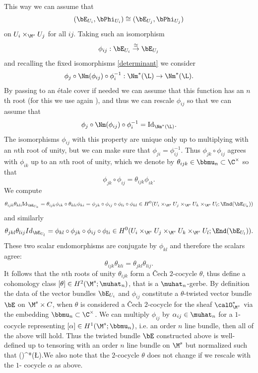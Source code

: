 This way we can assume that $$(\bE_{U_i},\bPhi_{U_i})\cong (\bE_{U_j},\bPhi_{U_j})$$ on $U_i\times_{\M^s} U_j$ for all ${ij}$. Taking such an isomorphism $$\phi_{ij}: \bE_{U_i} \stackrel{\cong}{\to} \bE_{U_j}$$ and recalling the fixed isomorphisms \eqref{determinant} we consider $$\phi_j\circ \Nm(\phi_{ij}) \circ \phi_i^{-1}:\Nm^*(\L)\to \Nm^*(\L).$$ By passing to an \'etale cover if needed we can assume that this function has an $n$th root (for this we use again \cite[Theorem 4.1]{artin}), and thus we can rescale $\phi_{ij}$ so that we can assume that $$\phi_j\circ \Nm(\phi_{ij}) \circ \phi_i^{-1}={\mathrm{Id}}_{\Nm^*(\L)}.$$ The isomorphisms $\phi_{ij}$ with this property are unique only up to multiplying with an $n$th root of unity, but we can make sure that $\phi_{ji}=\phi_{ij}^{-1}$.
Thus $\phi_{jk}\circ\phi_{ij}$ agrees with $\phi_{ik}$ up to an $n$th root of unity, which we denote by $\theta_{ijk}\in \bbmu_n\subset \C^\times$ so that $$\phi_{jk}\circ\phi_{ij}=\theta_{ijk}\phi_{ik}.$$
We compute $$\theta_{ijk} \theta_{kli}{\mathrm{Id}}_{\bE_{U_k}}= \theta_{ijk}\phi_{ik}\circ \theta_{kli}\phi_{ki}=\phi_{jk}\circ\phi_{ij}\circ \phi_{li}\circ\phi_{kl}\in H^0(U_i\times_{\M^s}U_j\times_{\M^s}U_k\times_{\M^s}U_l;\End(\bE_{U_k}))$$ and similarly
$$\theta_{jkl} \theta_{lij}Id_{\bE_{U_l}}= \phi_{kl}\circ\phi_{jk}\circ \phi_{ij}\circ\phi_{li}\in H^0(U_i\times_{\M^s}U_j\times_{\M^s}U_k\times_{\M^s}U_l;\End(\bE_{U_l})).$$
These two scalar endomorphisms are conjugate by $\phi_{kl}$ and therefore the scalars agree: $$\theta_{ijk} \theta_{kli}=\theta_{jkl} \theta_{lij}.$$ It follows that the $n$th roots of unity $\theta_{ijk}$ form a {\v{C}}ech $2$-cocycle $\theta$, thus define a cohomology class $[\theta]\in H^2(\M^s;\muhat_n)$, that is a $\muhat_n$-gerbe. By definition \cite[\S 1.2]{caldararu} the data of the vector bundles $\bE_{U_i}$ and  $\phi_{ij}$ constitute a $\theta$-twisted vector bundle $\bE$ on $\M^s\times C$, when $\theta$ is considered a  \v{C}ech $2$-cocycle for the sheaf $\calO_{\M^s}^*$ via the embedding $\bbmu_n\subset \C^\times$. We can multiply $\phi_{ij}$ by $\alpha_{ij}\in \muhat_n$ for a $1$-cocycle representing $[\alpha] \in H^1(\M^s; \bbmu_n)$, i.e. an order $n$ line bundle, then all of the above will hold. Thus the twisted bundle $\bE$ constructed above  is well-defined up to tensoring with an order $n$ line bundle on $\M^s$  but normalized such that \beq\label{normalise}\Nm(\bE)\cong \Nm^*(\L).\eeq We also note that the $2$-cocycle $\theta$ does not change if we rescale with the $1$- cocycle $\alpha$ as above. %
{}




